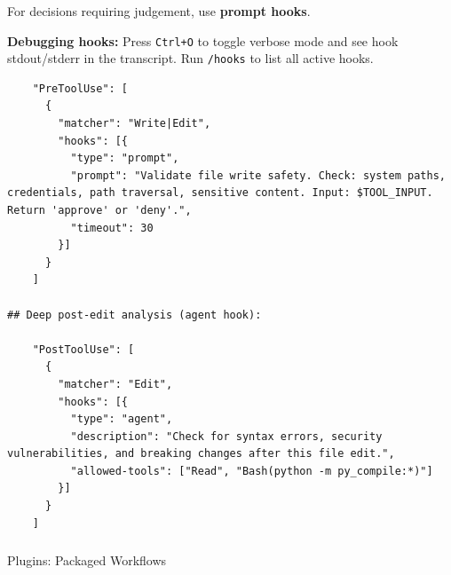 \begin{frame}[fragile]\frametitle{}
For decisions requiring judgement, use \textbf{prompt hooks}.

\textbf{Debugging hooks:} Press \texttt{Ctrl+O} to toggle verbose mode and see hook stdout/stderr in the transcript. Run \texttt{/hooks} to list all active hooks.


\begin{lstlisting}
    "PreToolUse": [
      {
        "matcher": "Write|Edit",
        "hooks": [{
          "type": "prompt",
          "prompt": "Validate file write safety. Check: system paths, credentials, path traversal, sensitive content. Input: $TOOL_INPUT. Return 'approve' or 'deny'.",
          "timeout": 30
        }]
      }
    ]

## Deep post-edit analysis (agent hook):

    "PostToolUse": [
      {
        "matcher": "Edit",
        "hooks": [{
          "type": "agent",
          "description": "Check for syntax errors, security vulnerabilities, and breaking changes after this file edit.",
          "allowed-tools": ["Read", "Bash(python -m py_compile:*)"]
        }]
      }
    ]
\end{lstlisting}

\end{frame}


\begin{frame}[fragile]\frametitle{}
\begin{center}
{\Large Plugins: Packaged Workflows}

\end{center}
\end{frame}


